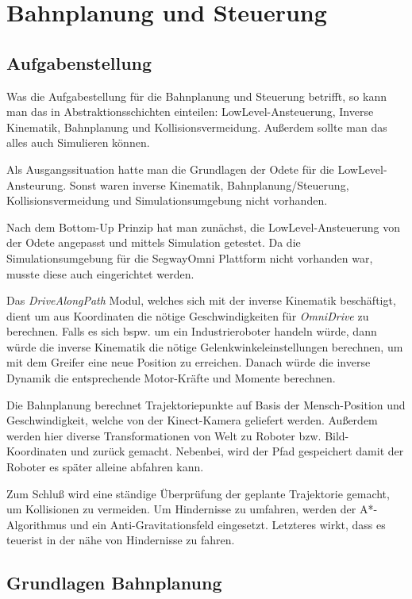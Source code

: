 
\chapter{Bahnplanung und Steuerung}


\section{Aufgabenstellung}
\authorsection{\editoroier}

Was die Aufgabestellung für die Bahnplanung und Steuerung betrifft, so kann man das in Abstraktionsschichten einteilen: LowLevel-Ansteuerung, Inverse Kinematik, Bahnplanung und Kollisionsvermeidung. Außerdem sollte man das alles auch Simulieren können.

Als Ausgangssituation hatte man die Grundlagen der Odete für die LowLevel-Ansteurung. Sonst waren inverse Kinematik, Bahnplanung/Steuerung, Kollisionsvermeidung und Simulationsumgebung nicht vorhanden.

Nach dem Bottom-Up Prinzip hat man zunächst, die LowLevel-Ansteuerung von der Odete angepasst und mittels Simulation getestet. Da die Simulationsumgebung für die SegwayOmni Plattform nicht vorhanden war, musste diese auch eingerichtet werden.

Das \textit{DriveAlongPath} Modul, welches sich mit der inverse Kinematik beschäftigt, dient um aus Koordinaten die nötige Geschwindigkeiten für \textit{OmniDrive} zu berechnen. Falls es sich bspw. um ein Industrieroboter handeln würde, dann würde die inverse Kinematik die nötige Gelenkwinkeleinstellungen berechnen, um mit dem Greifer eine neue Position zu erreichen. Danach würde die inverse Dynamik die entsprechende Motor-Kräfte und Momente berechnen.

Die Bahnplanung berechnet Trajektoriepunkte auf Basis der Mensch-Position und Geschwindigkeit, welche von der Kinect-Kamera geliefert werden. Außerdem werden hier diverse Transformationen von Welt zu Roboter bzw. Bild-Koordinaten und zurück gemacht. Nebenbei, wird der Pfad gespeichert damit der Roboter es später alleine abfahren kann.

Zum Schluß wird eine ständige Überprüfung der geplante Trajektorie gemacht, um Kollisionen zu vermeiden. Um Hindernisse zu umfahren, werden der A*-Algorithmus und ein Anti-Gravitationsfeld eingesetzt. Letzteres wirkt, dass es \glqq teuer\grqq \space ist in der nähe von Hindernisse zu fahren.




\section{Grundlagen Bahnplanung}
\authorsection{\editoroier}



